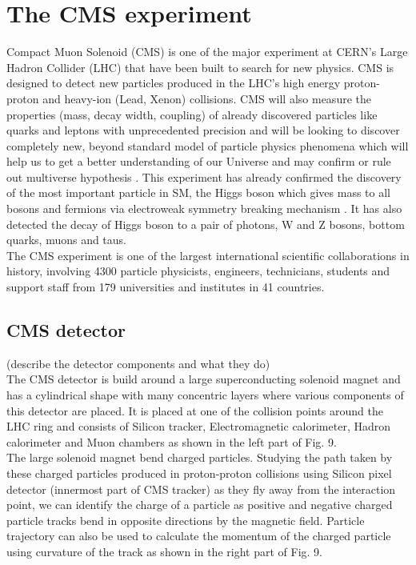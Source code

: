 \section{The CMS experiment}
\label{sec:cms}

\onehalfspacing Compact Muon Solenoid (CMS) is one of the major experiment at CERN's Large Hadron Collider (LHC) that have been built to search for new physics. CMS is designed to detect new particles produced in the LHC's high energy proton-proton and heavy-ion (Lead, Xenon) collisions. CMS will also measure the properties (mass, decay width, coupling) of already discovered particles like quarks and leptons with unprecedented precision and will be looking to discover completely new, beyond standard model of particle physics phenomena which will help us to get a better understanding of our Universe and may confirm or rule out multiverse hypothesis \cite{Chatrchyan:1129810}. This experiment has already confirmed the discovery of the most important particle in SM, the Higgs boson which gives mass to all bosons and fermions via electroweak symmetry breaking mechanism \cite{Chatrchyan:2012xdj}. It has also detected the decay of Higgs boson to a pair of photons, W and Z bosons, bottom quarks, muons and taus.  \\

The CMS experiment is one of the largest international scientific collaborations in history, involving 4300 particle physicists, engineers, technicians, students and support staff from 179 universities and institutes in 41 countries. \\

\subsection{CMS detector}
(describe the detector components and what they do) \\

The CMS detector is build around a large superconducting solenoid magnet and has a cylindrical shape with many concentric layers where various components of this detector are placed. It is placed at one of the collision points around the LHC ring and consists of Silicon tracker, Electromagnetic calorimeter, Hadron calorimeter and Muon chambers as shown in the left part of Fig. 9. \\

The large solenoid magnet bend charged particles. Studying the path taken by these charged particles produced in proton-proton collisions using Silicon pixel detector (innermost part of CMS tracker) as they fly away from the interaction point, we can identify the charge of a particle as positive and negative charged particle tracks bend in opposite directions by the magnetic field. Particle trajectory can also be used to calculate the momentum of the charged particle using curvature of the track as shown in the right part of Fig. 9. \\

